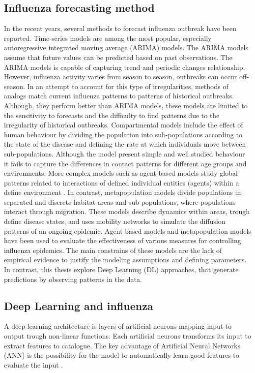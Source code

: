 \documentclass[12pt]{article}
\begin{document}
\subsection{Influenza forecasting method}

In the recent years, several  methods to forecast influenza outbreak have been reported\autocite{nsoesie2014}. Time-series models are among the most popular, especially  autoregressive integrated moving average (ARIMA) models. The ARIMA models assume that future values can be predicted based on past observations\autocite{quenel1998}. The ARIMA models is capable of capturing trend and periodic changes relationship. However, influenza activity varies from season to season, outbreaks can occur off-season. In an attempt to account for this type of irregularities, methods of analogs match current influenza patterns to patterns of historical outbreaks\autocite{viboud2003}. Although, they perform better than ARIMA models, these models are limited to the sensitivity to forecasts and the difficulty to find patterns due to the irregularity of historical outbreaks. Compartmental models include the effect of human behaviour by dividing the population into sub-populations according to the state of the disease and defining the rate at which individuals move between sub-populations. Although the model present simple and well studied behaviour it fails to capture the differences in contact patterns for different age groups and environments\autocite{degli2008}. More complex models such as agent-based models study global patterns related to interactions of defined individual entities (agents) within a define environment \autocite{carrasco2013}. In contrast, metapopulation models divide populations in separated and discrete habitat areas and sub-populations, where populations interact through migration. These models describe dynamics within areas, trough define disease states, and uses mobility networks to simulate the diffusion patterns of an ongoing epidemic. Agent based models and metapopulation models have been used to evaluate the effectiveness of various measures for controlling influenza epidemics. The main constrains of these models are the lack of empirical evidence to justify the modeling assumptions and defining parameters\autocite{nsoesie2014}. In contrast, this thesis explore Deep Learning (DL) approaches, that generate predictions by observing  patterns in the data. 

\subsection{Deep Learning and influenza}
A deep-learning architecture is layers of artificial neurons mapping input to output trough non-linear functions. Each artificial neurons transforms its input to extract features to catalogue\autocite{leCun2015}. The key advantage of Artificial Neural Networks (ANN) is the possibility for the model to automatically learn good features to evaluate the input \autocite{leCun2015, Miotto2017}. 
 
\end{document}
